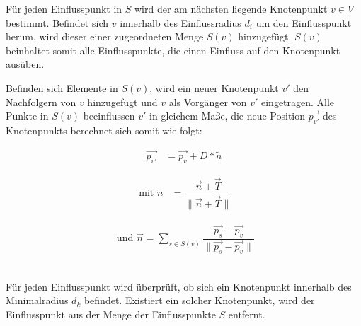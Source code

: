 \begin{description}[labelindent]
	\item[\boldmath$1.$] Für jeden Einflusspunkt in $S$ wird der am nächsten liegende Knotenpunkt $v\in V$ bestimmt. Befindet sich $v$ innerhalb des Einflussradius $d_i$ um den Einflusspunkt herum, wird dieser einer zugeordneten Menge $S(v)$ hinzugefügt. $S(v)$ beinhaltet somit alle Einflusspunkte, die einen Einfluss auf den Knotenpunkt ausüben. \cite[Abschn. 2]{SpaceColonizationAlgorithm:07} \label{alg:SCA_1}\\
	
	\item[\boldmath$2.$] Befinden sich Elemente in $S(v)$, wird ein neuer Knotenpunkt $v'$ den Nachfolgern von $v$ hinzugefügt und $v$ als Vorgänger von $v'$ eingetragen.  Alle Punkte in $S(v)$ beeinflussen $v'$ in gleichem Maße, die neue Position $\overrightarrow{p_{v'}}$ des Knotenpunkts berechnet sich somit wie folgt:
	
	\begin{equation}
	\begin{array}{ll}
	\overrightarrow{p_{v'}} & = \overrightarrow{p_v} + D * \tilde{n}
	\end{array}
	\end{equation} 
	
	\begin{equation}
	\begin{array}{ll}
	\text{  mit  } \tilde{n} & = \dfrac{\overrightarrow{n} + \overrightarrow{T} }{\lVert\overrightarrow{n} + \overrightarrow{T}\rVert}  
	\end{array}
	\end{equation} 
	
	\begin{equation}
	\begin{array}{ll}
	\text{ und }  \overrightarrow{n} = \sum\limits_{s \in S(v)}\dfrac{\overrightarrow{p_s} - \overrightarrow{p_v}}{\lVert \overrightarrow{p_s} - \overrightarrow{p_v} \rVert}
	\end{array}
	\end{equation}	
	\cite[Abschn. 2]{SpaceColonizationAlgorithm:07} \label{alg:SCA_2}\\
	
	\item[\boldmath$3.$] Für jeden Einflusspunkt wird überprüft, ob sich ein Knotenpunkt innerhalb des Minimalradius $d_k$ befindet. Existiert ein solcher Knotenpunkt, wird der Einflusspunkt aus der Menge der Einflusspunkte $S$ entfernt. \cite[Abschn. 2]{SpaceColonizationAlgorithm:07} \label{alg:SCA_3}
\end{description}

